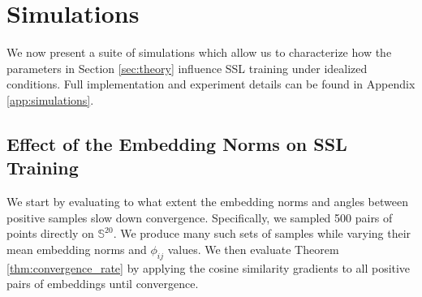 
        



\section{Simulations}
\label{sec:simulations}

We now present a suite of simulations which allow us to characterize how the parameters in Section \ref{sec:theory} influence SSL training under idealized conditions. Full implementation and experiment details can be found in Appendix \ref{app:simulations}.

\subsection{Effect of the Embedding Norms on SSL Training}
\label{ssec:convergence_simulations}


We start by evaluating to what extent the embedding norms and angles between positive samples slow down convergence. Specifically, we sampled 500 pairs of points directly on $\mathbb{S}^{20}$.
We produce many such sets of samples while varying their mean embedding norms and $\phi_{ij}$ values. We then evaluate Theorem \ref{thm:convergence_rate} by
applying the cosine similarity gradients to all positive pairs of embeddings until convergence.

